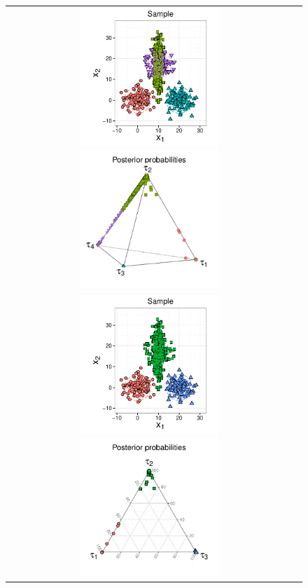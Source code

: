\documentclass[submit]{smj}
\theoremstyle{definition}
\begin{document}
\begin{figure}[thbp]
\begin{center}
\begin{tabular}{cc}
\includegraphics[width=0.5\textwidth]{figures/ex_4clust.pdf}
\includegraphics[width=0.5\textwidth]{figures/ex_quaternaryb.pdf}\\
\includegraphics[width=0.5\textwidth]{figures/ex_3clust.pdf}
\includegraphics[width=0.5\textwidth]{figures/ex_ternary.pdf}

\end{tabular}
\end{center}
\end{figure}
\end{document}
